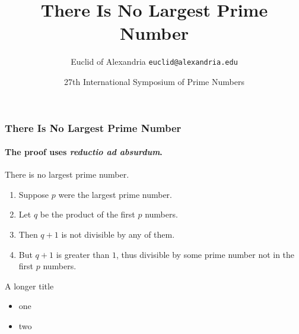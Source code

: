 \documentclass{beamer}
\title{There Is No Largest Prime Number}
\date[ISPN ’80]{27th International Symposium of Prime Numbers}
\author[Euclid]{Euclid of Alexandria \texttt{euclid@alexandria.edu}}
\begin{document}
\begin{frame}
\titlepage
\end{frame}

\begin{frame} 
\frametitle{There Is No Largest Prime Number} 
\framesubtitle{The proof uses \textit{reductio ad absurdum}.} 
\begin{theorem}
There is no largest prime number. \end{theorem} 
\begin{enumerate} 
\item<1-| alert@1> Suppose $p$ were the largest prime number. 
\item<2-> Let $q$ be the product of the first $p$ numbers. 
\item<3-> Then $q+1$ is not divisible by any of them. 
\item<1-> But $q + 1$ is greater than $1$, thus divisible by some prime
number not in the first $p$ numbers.
\end{enumerate}
\end{frame}

\begin{frame}{A longer title}
\begin{itemize}
\item one
\item two
\end{itemize}
\end{frame}
\end{document}
